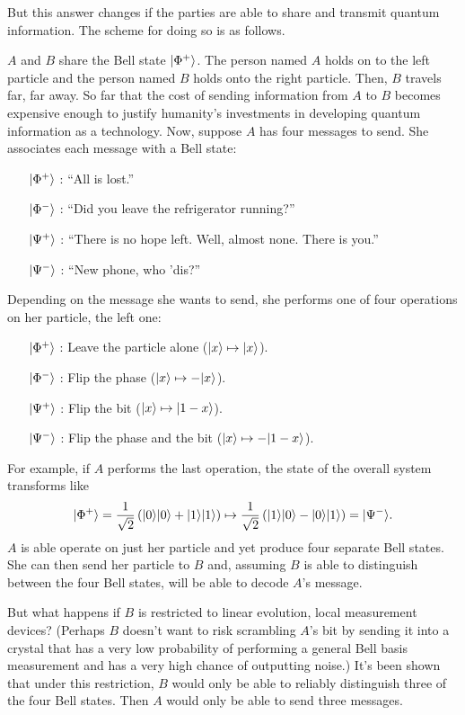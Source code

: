 But this answer changes if the parties are able to share and transmit quantum information. The scheme for doing so is as follows.

$A$ and $B$ share the Bell state $| \Phi^+ \rangle$. The person named $A$ holds on to the left particle and the person named $B$ holds onto the right particle. Then, $B$ travels far, far away. So far that the cost of sending information from $A$ to $B$ becomes expensive enough to justify humanity's investments in developing quantum information as a technology. Now, suppose $A$ has four messages to send. She associates each message with a Bell state:
\begin{enumerate}
	\item[$| \Phi^+ \rangle$]: ``All is lost.''
	\item[$| \Phi^- \rangle$]: ``Did you leave the refrigerator running?''
	\item[$| \Psi^+ \rangle$]: ``There is no hope left. Well, almost none. There is you.''
	\item[$| \Psi^- \rangle$]: ``New phone, who 'dis?''
\end{enumerate}
Depending on the message she wants to send, she performs one of four operations on her particle, the left one:
\begin{enumerate}
	\item[$| \Phi^+ \rangle$]: Leave the particle alone ($| x \rangle \mapsto | x \rangle$).
	\item[$| \Phi^- \rangle$]: Flip the phase ($| x \rangle \mapsto -| x \rangle$).
	\item[$| \Psi^+ \rangle$]: Flip the bit ($| x \rangle \mapsto | 1-x \rangle$).
	\item[$| \Psi^- \rangle$]: Flip the phase and the bit ($| x \rangle \mapsto -| 1-x \rangle$).
\end{enumerate}
For example, if $A$ performs the last operation, the state of the overall system transforms like
\[
| \Phi^+ \rangle = \frac{1}{\sqrt{2}} \left(| 0 \rangle| 0 \rangle + | 1 \rangle| 1 \rangle\right)  \mapsto \frac{1}{\sqrt{2}} \left(| 1 \rangle| 0 \rangle - | 0 \rangle| 1 \rangle\right) = | \Psi^- \rangle.
\]
$A$ is able operate on just her particle and yet produce four separate Bell states. She can then send her particle to $B$ and, assuming $B$ is able to distinguish between the four Bell states, will be able to decode $A$'s message.

But what happens if $B$ is restricted to linear evolution, local measurement devices? (Perhaps $B$ doesn't want to risk scrambling $A$'s bit by sending it into a crystal that has a very low probability of performing a general Bell basis measurement and has a very high chance of outputting noise.) It's been shown that under this restriction, $B$ would only be able to reliably distinguish three of the four Bell states. Then $A$ would only be able to send three messages.

